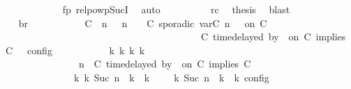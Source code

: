 \begin{isabellebody}
\ \ \ \ \ \ \ \ \ \ \isamarkupfalse%
\ fp\ relpowp{\isacharunderscore}Suc{\isacharunderscore}I{}\ \isamarkupfalse%
\ auto\isanewline
\ \ \ \ \ \ \ \ \isamarkupfalse%
\ rc\ \isamarkupfalse%
\ {\isacharquery}thesis\ \isamarkupfalse%
\ blast\isanewline
\ \ \ \ \ \ \isamarkupfalse%
\isanewline
\ \ \ \ \ \ \isamarkupfalse%
\ \isamarkupfalse%
\ br{}{\isacharcolon}\isanewline
\ \ \ \ \ \ \ \ {\isacartoucheopen}{\isasymrho}\ {\isasymin}\ {\isasymlbrakk}\ {\isacharparenleft}{\isacharparenleft}C\ {\isasymUp}\ n{\isacharparenright}\ {\isacharhash}\ {\isasymGamma}{\isacharparenright}{\isacharcomma}\ n\ {\isasymturnstile}\ {\isasymPsi}\ {\isasymtriangleright}\ {\isacharparenleft}{\isacharparenleft}C\ sporadic{\isasymsharp}\ {\isasymlparr}{\isasymtau}\isactrlsub v\isactrlsub a\isactrlsub r{\isacharparenleft}C\ n{\isacharparenright}\ {\isasymoplus}\ {\isasymdelta}{\isasymtau}{\isasymrparr}\ on\ C\isanewline
\ \ \ \ \ \ \ \ \ \ \ \ \ \ \ \ \ \ \ \ \ \ \ \ \ \ \ \ \ \ \ \ \ \ \ \ \ \ \ {\isacharhash}\ {\isacharparenleft}C\ time{\isacharminus}delayed{\isasymbowtie}\ by\ {\isasymdelta}{\isasymtau}\ on\ C\ implies\ C\ {\isacharhash}\ {\isasymPhi}{\isacharparenright}\ {\isasymrbrakk}\isactrlsub c\isactrlsub o\isactrlsub n\isactrlsub f\isactrlsub i\isactrlsub g\isanewline
\ \ \ \ \ \ \ \ \ \ {\isasymLongrightarrow}\ {\isasymexists}{\isasymGamma}\isactrlsub k\ {\isasymPsi}\isactrlsub k\ {\isasymPhi}\isactrlsub k\ k{\isachardot}\isanewline
\ \ \ \ \ \ \ \ \ \ \ \ \ \ {\isacharparenleft}{\isacharparenleft}{\isasymGamma}{\isacharcomma}\ n\ {\isasymturnstile}\ {\isacharparenleft}{\isacharparenleft}C\ time{\isacharminus}delayed{\isasymbowtie}\ by\ {\isasymdelta}{\isasymtau}\ on\ C\ implies\ C\ {\isacharhash}\ {\isasymPsi}{\isacharparenright}\ {\isasymtriangleright}\ {\isasymPhi}{\isacharparenright}\isanewline
\ \ \ \ \ \ \ \ \ \ \ \ \ \ {\isasymhookrightarrow}\isactrlbsup k\isactrlesup \ {\isacharparenleft}{\isasymGamma}\isactrlsub k{\isacharcomma}\ Suc\ n\ {\isasymturnstile}\ {\isasymPsi}\isactrlsub k\ {\isasymtriangleright}\ {\isasymPhi}\isactrlsub k{\isacharparenright}{\isacharparenright}\ {\isasymand}\ {\isasymrho}\ {\isasymin}\ {\isasymlbrakk}\ {\isasymGamma}\isactrlsub k{\isacharcomma}\ Suc\ n\ {\isasymturnstile}\ {\isasymPsi}\isactrlsub k\ {\isasymtriangleright}\ {\isasymPhi}\isactrlsub k\ {\isasymrbrakk}\isactrlsub c\isactrlsub o\isactrlsub n\isactrlsub f\isactrlsub i\isactrlsub g{\isacartoucheclose}\isanewline

\end{isabellebody}
